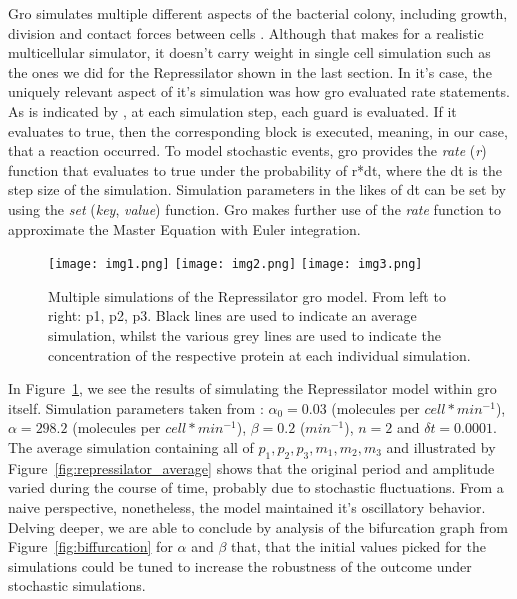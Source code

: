 \documentclass[12pt]{article}
\begin{document}
    Gro simulates multiple different aspects of the bacterial colony, including growth, division and contact forces between cells \cite{Jang2012}. Although that makes for a realistic multicellular simulator, it doesn't carry weight in single cell simulation such as the ones we did for the Repressilator shown in the last section. In it's case, the uniquely relevant aspect of it's simulation was how gro evaluated rate statements. As is indicated by \cite{Hoops2006}, at each simulation step, each guard is evaluated. If it evaluates to true, then the corresponding block is executed, meaning, in our case, that a reaction occurred. To model stochastic events, gro provides the \textit{rate} (\textit{r}) function that evaluates to true under the probability of r*dt, where the dt is the step size of the simulation. Simulation parameters in the likes of dt can be set by using the \textit{set} (\textit{key}, \textit{value}) function. Gro makes further use of the \textit{rate} function to approximate the Master Equation with Euler integration. 
    
    \begin{figure}[ht]
    \centering
      \texttt{[image: img1.png]}
    \endminipage\hfill
      \texttt{[image: img2.png]}
    \endminipage\hfill
      \texttt{[image: img3.png]}
    \endminipage
    \caption{Multiple simulations of the Repressilator gro model. From left to right: p1, p2, p3. Black lines are used to indicate an average simulation, whilst the various grey lines are used to indicate the concentration of the respective protein at each individual simulation.}
    \label{fig:tons_of_simulations}
    \end{figure}

   In Figure~\ref{fig:tons_of_simulations}, we see the results of simulating the Repressilator model within gro itself. Simulation parameters taken from \cite{ingalls2013mathematical}: $\alpha_{0} = 0.03$ (molecules per $cell*min^{-1}$), $\alpha = 298.2$ (molecules per $cell*min^{-1}$), $\beta = 0.2$ ($min^{-1}$), $n = 2$ and $\delta t = 0.0001$. The average simulation containing all of $p_{1}, p_{2}, p_{3}, m_{1}, m_{2}, m_{3}$ and illustrated by Figure~\ref{fig:repressilator_average} shows that the original period and amplitude varied during the course of time, probably due to stochastic fluctuations. From a naive perspective, nonetheless, the model maintained it's oscillatory behavior. Delving deeper, we are able to conclude by analysis of the bifurcation graph from Figure~\ref{fig:biffurcation} for $\alpha$ and $\beta$ that, that the initial values picked for the simulations could be tuned to increase the robustness of the outcome under stochastic simulations.
\end{document}
